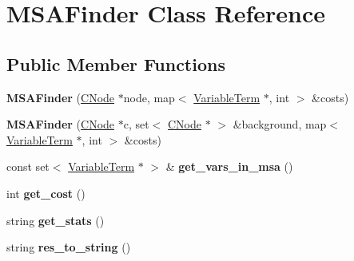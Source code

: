 \hypertarget{classMSAFinder}{\section{\-M\-S\-A\-Finder \-Class \-Reference}
\label{classMSAFinder}
}
\subsection*{\-Public \-Member \-Functions}
\begin{DoxyCompactItemize}
\item 
\hypertarget{classMSAFinder_a2a25978d31ed79fb09f7a94cad9d181d}{{\bfseries \-M\-S\-A\-Finder} (\hyperlink{classCNode}{\-C\-Node} $\ast$node, map$<$ \hyperlink{classVariableTerm}{\-Variable\-Term} $\ast$, int $>$ \&costs)}\label{classMSAFinder_a2a25978d31ed79fb09f7a94cad9d181d}

\item 
\hypertarget{classMSAFinder_ab32e9c297724f65fdf6b2b6b7c07473f}{{\bfseries \-M\-S\-A\-Finder} (\hyperlink{classCNode}{\-C\-Node} $\ast$c, set$<$ \hyperlink{classCNode}{\-C\-Node} $\ast$ $>$ \&background, map$<$ \hyperlink{classVariableTerm}{\-Variable\-Term} $\ast$, int $>$ \&costs)}\label{classMSAFinder_ab32e9c297724f65fdf6b2b6b7c07473f}

\item 
\hypertarget{classMSAFinder_a4ac67540b4837447192a3edee8f5bb82}{const set$<$ \hyperlink{classVariableTerm}{\-Variable\-Term} $\ast$ $>$ \& {\bfseries get\-\_\-vars\-\_\-in\-\_\-msa} ()}\label{classMSAFinder_a4ac67540b4837447192a3edee8f5bb82}

\item 
\hypertarget{classMSAFinder_a43f453ab387cbed3cda1e12bea45b896}{int {\bfseries get\-\_\-cost} ()}\label{classMSAFinder_a43f453ab387cbed3cda1e12bea45b896}

\item 
\hypertarget{classMSAFinder_a49f093494327a0fd187fe21df8bb9345}{string {\bfseries get\-\_\-stats} ()}\label{classMSAFinder_a49f093494327a0fd187fe21df8bb9345}

\item 
\hypertarget{classMSAFinder_ab79f4be9438081d31b0042a58c5dfb31}{string {\bfseries res\-\_\-to\-\_\-string} ()}\label{classMSAFinder_ab79f4be9438081d31b0042a58c5dfb31}

\end{DoxyCompactItemize}

